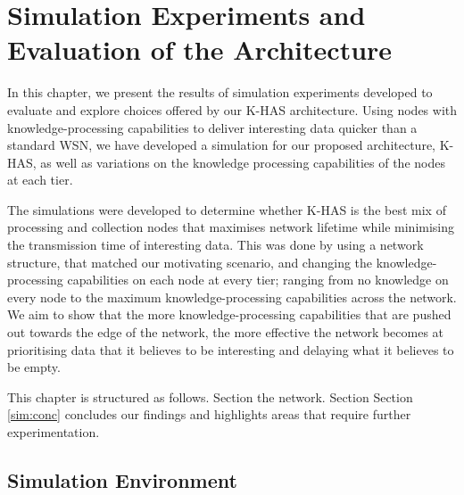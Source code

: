 \chapter{Simulation Experiments and Evaluation of the Architecture}
In this chapter, we present the results of simulation experiments developed to evaluate and explore choices offered by our K-HAS architecture. Using nodes with knowledge-processing capabilities to deliver interesting data quicker than a standard WSN, we have developed a simulation for our proposed architecture, K-HAS, as well as variations on the knowledge processing capabilities of the nodes at each tier.

The simulations were developed to determine whether K-HAS is the best mix of processing and collection nodes that maximises network lifetime while minimising the transmission time of interesting data. This was done by using a network structure, that matched our motivating scenario, and changing the knowledge-processing capabilities on each node at every tier; ranging from no knowledge on every node to the maximum knowledge-processing capabilities across the network. We aim to show that the more knowledge-processing capabilities that are pushed out towards the edge of the network, the more effective the network becomes at prioritising data that it believes to be interesting and delaying what it believes to be empty.

This chapter is structured as follows. Section \DIFdelbegin {}\DIFdelend \DIFaddbegin {}\DIFaddend the network. Section \DIFdelbegin {}\DIFdelend \DIFaddbegin {}\DIFaddend Section \ref{sim:conc} concludes our findings and highlights areas that require further experimentation.

\section{Simulation Environment}\DIFdelbegin %

